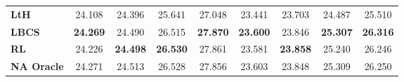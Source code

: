 \begin{tabular}{lcccc|cccc}
\textbf{LtH } & {24.108} & 24.396 & {25.641} & {27.048} & 23.441 & 23.703 & 24.487 & 25.510 \\
\textbf{LBCS } & \textbf{24.269} & {24.490} & {26.515} & \textbf{27.870} & \textbf{23.600} & 23.846 & \textbf{25.307} & \textbf{26.316} \\
\textbf{RL } & 24.226 & \textbf{24.498} & \textbf{26.530} & {27.861} & {23.581} & \textbf{23.858} & {25.240} & {26.246} \\
\midrule
\textbf{NA Oracle } & 24.271 & 24.513 & 26.528 & 27.856 & 23.603 & 23.848 & 25.309 & 26.250\\
\bottomrule
\end{tabular}